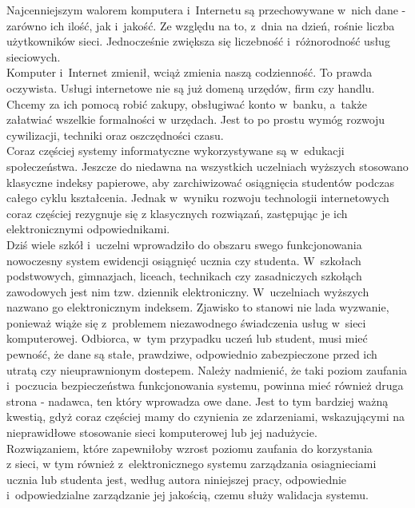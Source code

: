 \documentclass{xmgr}
\begin{document}
\indent \indent \textcolor{wa}{Najcenniejszym walorem komputera i~Internetu są przechowywane w~nich dane - zarówno
ich ilość, jak i~jakość. Ze względu na to, z~dnia na dzień, rośnie liczba
użytkowników sieci. Jednocześnie zwiększa się liczebność i~różnorodność usług
sieciowych.}
\\
\indent \textcolor{wa}{Komputer i~Internet zmienił, wciąż zmienia naszą codzienność. To prawda oczywista.
Usługi internetowe nie są już domeną urzędów, firm czy handlu. Chcemy za ich pomocą
robić zakupy, obsługiwać konto w~banku, a~także załatwiać wszelkie formalności w
urzędach. Jest to po prostu wymóg rozwoju cywilizacji, techniki oraz oszczędności
czasu.}
\\
\indent \textcolor{wa}{Coraz częściej systemy informatyczne wykorzystywane są w~edukacji społeczeństwa.
Jeszcze do niedawna na wszystkich uczelniach wyższych stosowano klasyczne indeksy
papierowe, aby zarchiwizować osiągnięcia studentów podczas całego cyklu kształcenia.
Jednak w~wyniku rozwoju technologii internetowych coraz częściej rezygnuje się
z klasycznych rozwiązań, zastępując je ich elektronicznymi odpowiednikami.}
\\
\indent \textcolor{wb}{Dziś wiele szkół i~uczelni wprowadziło do obszaru swego funkcjonowania nowoczesny
system ewidencji osiągnięć ucznia czy studenta. W~szkołach podstwowych, gimnazjach,
liceach, technikach czy zasadniczych szkołąch zawodowych jest nim tzw. dziennik
elektroniczny. W~uczelniach wyższych  nazwano go elektronicznym indeksem. Zjawisko
to stanowi nie lada wyzwanie, ponieważ wiąże się z~problemem niezawodnego świadczenia
usług w~sieci komputerowej. Odbiorca, w~tym przypadku uczeń lub student, musi mieć
pewność, że dane są stałe, prawdziwe, odpowiednio zabezpieczone przed ich utratą
czy nieuprawnionym dostepem. Należy nadmienić, że taki poziom zaufania i~poczucia
bezpieczeństwa funkcjonowania systemu, powinna mieć również druga strona - nadawca,
ten który wprowadza owe dane. Jest to tym bardziej ważną kwestią, gdyż coraz częściej
mamy do czynienia ze zdarzeniami, wskazującymi na nieprawidłowe stosowanie sieci
komputerowej lub jej nadużycie.}
\\
\indent \textcolor{wa}{Rozwiązaniem, które zapewniłoby wzrost poziomu zaufania do korzystania
\\
z sieci,
w tym również z~elektronicznego systemu zarządzania osiagnieciami ucznia lub studenta
jest, według autora niniejszej pracy, odpowiednie i~odpowiedzialne zarządzanie jej
jakością, czemu służy walidacja systemu.}
\\
\end{document}

